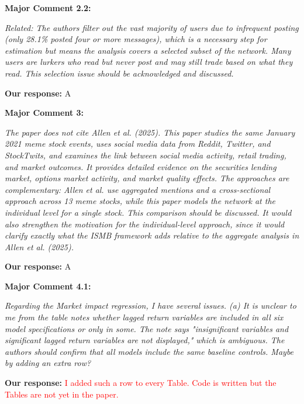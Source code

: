 \documentclass[11pt]{article}
\newcommand{\reviewercomment}[1]{\begin{commentbox}\textit{#1}\end{commentbox}}
\newcommand{\ourresponse}[1]{\textbf{Our response:} #1}
\begin{document}
\bigskip

\textbf{Major Comment 2.2:}

\reviewercomment{%
	Related: The authors filter out the vast majority of users due to infrequent posting (only 28.1\% posted four or more messages), which is a necessary step for estimation but means the analysis covers a selected subset of the network. Many users are lurkers who read but never post and may still trade based on what they read. This selection issue should be acknowledged and discussed.
}

\ourresponse{
	A
}

\bigskip

\textbf{Major Comment 3:}

\reviewercomment{%
	The paper does not cite Allen et al. (2025). This paper studies the same January 2021 meme stock events, uses social media data from Reddit, Twitter, and StockTwits, and examines the link between social media activity, retail trading, and market outcomes. It provides detailed evidence on the securities lending market, options market activity, and market quality effects. The approaches are complementary: Allen et al. use aggregated mentions and a cross-sectional approach across 13 meme stocks, while this paper models the network at the individual level for a single stock. This comparison should be discussed. It would also strengthen the motivation for the individual-level approach, since it would clarify exactly what the ISMB framework adds relative to the aggregate analysis in Allen et al. (2025). 
}

\ourresponse{
	A
}

\bigskip

\textbf{Major Comment 4.1:}

\reviewercomment{%
	Regarding the Market impact regression, I have several issues.
	(a) It is unclear to me from the table notes whether lagged return variables are included in all six model specifications or only in some. The note says "insignificant variables and significant lagged return variables are not displayed," which is ambiguous. The authors should confirm that all models include the same baseline controls. Maybe by adding an extra row? 
}

\ourresponse{
	\textcolor{red}{I added such a row to every Table. Code is written but the Tables are not yet in the paper.}
}
\end{document}
